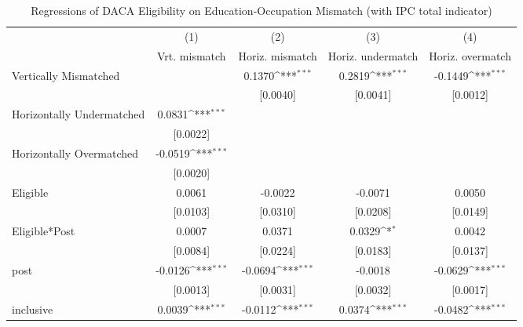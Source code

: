 \begin{table}[htbp]\centering
\def\sym#1{\ifmmode^{#1}\else\(^{#1}\)\fi}
\caption{Regressions of DACA Eligibility on Education-Occupation Mismatch (with IPC total indicator)}
\begin{tabular}{l*{4}{c}}
\toprule
                    &\multicolumn{1}{c}{(1)}         &\multicolumn{1}{c}{(2)}         &\multicolumn{1}{c}{(3)}         &\multicolumn{1}{c}{(4)}         \\
                    &Vrt. mismatch         &Horiz. mismatch         &Horiz. undermatch         &Horiz. overmatch         \\
\midrule
Vertically Mismatched&                     &      0.1370\sym{***}&      0.2819\sym{***}&     -0.1449\sym{***}\\
                    &                     &    [0.0040]         &    [0.0041]         &    [0.0012]         \\
\addlinespace
Horizontally Undermatched&      0.0831\sym{***}&                     &                     &                     \\
                    &    [0.0022]         &                     &                     &                     \\
\addlinespace
Horizontally Overmatched&     -0.0519\sym{***}&                     &                     &                     \\
                    &    [0.0020]         &                     &                     &                     \\
\addlinespace
Eligible            &      0.0061         &     -0.0022         &     -0.0071         &      0.0050         \\
                    &    [0.0103]         &    [0.0310]         &    [0.0208]         &    [0.0149]         \\
\addlinespace
Eligible*Post       &      0.0007         &      0.0371         &      0.0329\sym{*}  &      0.0042         \\
                    &    [0.0084]         &    [0.0224]         &    [0.0183]         &    [0.0137]         \\
\addlinespace
post                &     -0.0126\sym{***}&     -0.0694\sym{***}&     -0.0018         &     -0.0629\sym{***}\\
                    &    [0.0013]         &    [0.0031]         &    [0.0032]         &    [0.0017]         \\
\addlinespace
inclusive           &      0.0039\sym{***}&     -0.0112\sym{***}&      0.0374\sym{***}&     -0.0482\sym{***}\\

\end{tabular}
\end{table}
